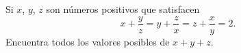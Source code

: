 
Si $x$, $y$, $z$ son números positivos que satisfacen
\[x+\frac{y}{z}=y+\frac{z}{x}=z+\frac{x}{y}=2. \]
Encuentra todos los valores posibles de $x+y+z$.
